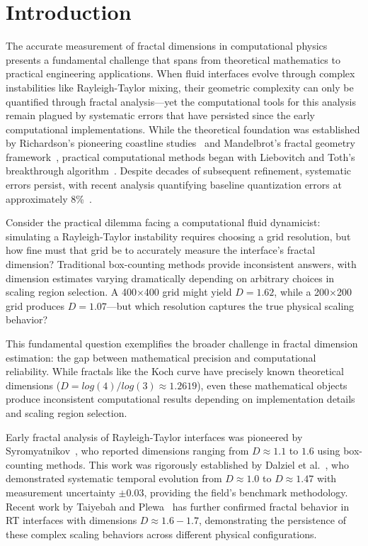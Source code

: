 \documentclass[preprint,12pt]{elsarticle}
\def\log{log}%
\begin{document}

\section{Introduction}
\label{sec:introduction}

The accurate measurement of fractal dimensions in computational physics presents a fundamental challenge that spans from theoretical mathematics to practical engineering applications. When fluid interfaces evolve through complex instabilities like Rayleigh-Taylor mixing, their geometric complexity can only be quantified through fractal analysis—yet the computational tools for this analysis remain plagued by systematic errors that have persisted since the early computational implementations. While the theoretical foundation was established by Richardson's pioneering coastline studies~\cite{richardson1961} and Mandelbrot's fractal geometry framework~\cite{mandelbrot1967}, practical computational methods began with Liebovitch and Toth's breakthrough algorithm~\cite{liebovitch1989}. Despite decades of subsequent refinement, systematic errors persist, with recent analysis quantifying baseline quantization errors at approximately 8\%~\cite{bouda2016}.

Consider the practical dilemma facing a computational fluid dynamicist: simulating a Rayleigh-Taylor instability requires choosing a grid resolution, but how fine must that grid be to accurately measure the interface's fractal dimension? Traditional box-counting methods provide inconsistent answers, with dimension estimates varying dramatically depending on arbitrary choices in scaling region selection. A 400×400 grid might yield $D = 1.62$, while a 200×200 grid produces $D = 1.07$—but which resolution captures the true physical scaling behavior?

This fundamental question exemplifies the broader challenge in fractal dimension estimation: the gap between mathematical precision and computational reliability. While fractals like the Koch curve have precisely known theoretical dimensions ($D = \log(4)/\log(3) \approx 1.2619$), even these mathematical objects produce inconsistent computational results depending on implementation details and scaling region selection.

Early fractal analysis of Rayleigh-Taylor interfaces was pioneered by Syromyatnikov~\cite{syromyatnikov1993}, who reported dimensions ranging from $D \approx 1.1$ to $1.6$ using box-counting methods. This work was rigorously established by Dalziel et al.~\cite{dalziel1999}, who demonstrated systematic temporal evolution from $D \approx 1.0$ to $D \approx 1.47$ with measurement uncertainty $\pm 0.03$, providing the field's benchmark methodology. Recent work by Taiyebah and Plewa~\cite{taiyebah2024}  has further confirmed fractal behavior in RT interfaces with dimensions $D \approx 1.6-1.7$, demonstrating the persistence of these complex scaling behaviors across different physical configurations.
\end{document}
